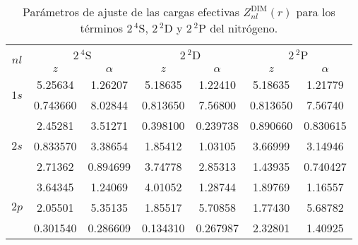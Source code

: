 \begin{table}
\centering
\begin{tabular}{|c|c|c|c|c|c|c|}
\hline
\multirow{2}{*}{$nl$} 
  & \multicolumn{2}{c}{$2\,^4$S} 
  & \multicolumn{2}{c}{$2\,^2$D} 
  & \multicolumn{2}{c}{$2\,^2$P} \\
\cline{2-7}
       & $z$ & $\alpha$ 
       & $z$ & $\alpha$ 
       & $z$ & $\alpha$ \\
\hline
\hline
\multirow{2}{*}{$1s$} & 5.25634  & 1.26207 
       & 5.18635  & 1.22410
       & 5.18635 & 1.21779  \\
\vspace*{0.09cm}
       & 0.743660 & 8.02844 
       & 0.813650 & 7.56800
       & 0.813650 & 7.56740   \\
\hline
\multirow{3}{*}{$2s$} & 2.45281  & 3.51271 
       & 0.398100 & 0.239738
       & 0.890660 & 0.830615  \\
       & 0.833570  & 3.38654 
       & 1.85412  & 1.03105
       & 3.66999  & 3.14946   \\
\vspace*{0.09cm}
       & 2.71362  & 0.894699 
       & 3.74778  & 2.85313
       & 1.43935  & 0.740427  \\
\hline
\multirow{3}{*}{$2p$}  & 3.64345  & 1.24069 
       & 4.01052  & 1.28744
       & 1.89769  & 1.16557  \\
       & 2.05501  & 5.35135 
       & 1.85517  & 5.70858 
       & 1.77430   & 5.68782 \\
       & 0.301540 & 0.286609 
       & 0.134310  & 0.267987
       & 2.32801  & 1.40925  \\
\hline
\end{tabular}
\caption[Parámetros de ajuste de cargas efectivas de nitrógeno.]
{Parámetros de ajuste de las cargas efectivas 
$Z_{nl}^{\mathrm{DIM}}(r)$ para los términos $2\,^4$S, $2\,^2$D y
$2\,^2$P del nitrógeno.}
\label{tab:parametersNitro}
\end{table}

